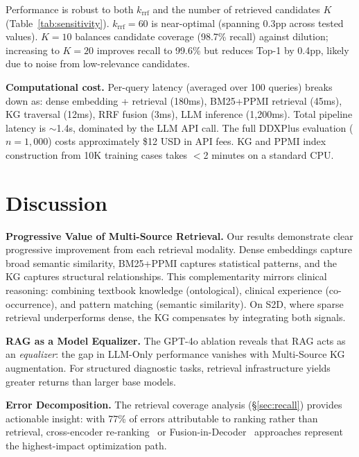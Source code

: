 \documentclass[runningheads]{llncs}
\begin{document}
Performance is robust to both $k_{\text{rrf}}$ and the number of retrieved candidates $K$ (Table~\ref{tab:sensitivity}). $k_{\text{rrf}}{=}60$ is near-optimal (spanning 0.3pp across tested values). $K{=}10$ balances candidate coverage (98.7\% recall) against dilution; increasing to $K{=}20$ improves recall to 99.6\% but reduces Top-1 by 0.4pp, likely due to noise from low-relevance candidates.

\textbf{Computational cost.} Per-query latency (averaged over 100 queries) breaks down as: dense embedding + retrieval (180ms), BM25+PPMI retrieval (45ms), KG traversal (12ms), RRF fusion (3ms), LLM inference (1,200ms). Total pipeline latency is ${\sim}$1.4s, dominated by the LLM API call. The full DDXPlus evaluation ($n{=}1{,}000$) costs approximately \$12 USD in API fees. KG and PPMI index construction from 10K training cases takes $<$2 minutes on a standard CPU.

\section{Discussion}
\label{sec:discussion}

\textbf{Progressive Value of Multi-Source Retrieval.}
Our results demonstrate clear progressive improvement from each retrieval modality. Dense embeddings capture broad semantic similarity, BM25+PPMI captures statistical patterns, and the KG captures structural relationships. This complementarity mirrors clinical reasoning: combining textbook knowledge (ontological), clinical experience (co-occurrence), and pattern matching (semantic similarity). On S2D, where sparse retrieval underperforms dense, the KG compensates by integrating both signals.

\textbf{RAG as a Model Equalizer.}
The GPT-4o ablation reveals that RAG acts as an \emph{equalizer}: the gap in LLM-Only performance vanishes with Multi-Source KG augmentation. For structured diagnostic tasks, retrieval infrastructure yields greater returns than larger base models.

\textbf{Error Decomposition.}
The retrieval coverage analysis (\S\ref{sec:recall}) provides actionable insight: with 77\% of errors attributable to ranking rather than retrieval, cross-encoder re-ranking~\cite{nogueira2020passage} or Fusion-in-Decoder~\cite{izacard2021leveraging} approaches represent the highest-impact optimization path.
\end{document}
